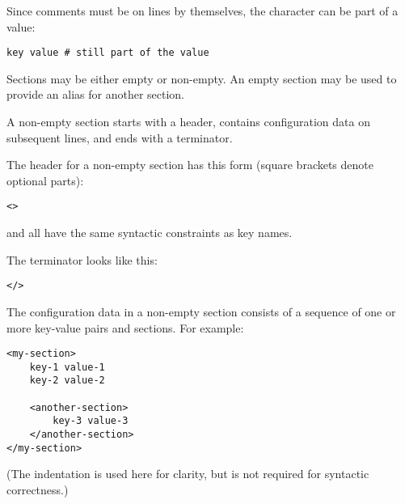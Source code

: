 \documentclass{howto}
\begin{document}
Since comments must be on lines by themselves, the \character{\#}
character can be part of a value:

\begin{verbatim}
key value # still part of the value
\end{verbatim}

Sections may be either empty or non-empty.  An empty section may be
used to provide an alias for another section.

A non-empty section starts with a header, contains configuration
data on subsequent lines, and ends with a terminator.

The header for a non-empty section has this form (square brackets
denote optional parts):

\begin{alltt}
<  >
\end{alltt}

 and  %
all have the same syntactic constraints as key names.

The terminator looks like this:

\begin{alltt}
</>
\end{alltt}

The configuration data in a non-empty section consists of a sequence
of one or more key-value pairs and sections.  For example:

\begin{verbatim}
<my-section>
    key-1 value-1
    key-2 value-2

    <another-section>
        key-3 value-3
    </another-section>
</my-section>
\end{verbatim}

(The indentation is used here for clarity, but is not required for
syntactic correctness.)


\end{document}
